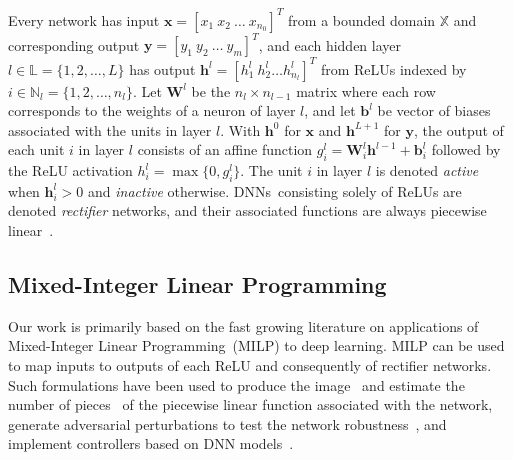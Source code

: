 \documentclass[runningheads]{llncs}
\def\vb{{\bm{b}}}
\def\vh{{\bm{h}}}
\def\vx{{\bm{x}}}
\def\vy{{\bm{y}}}
\def\evg{{g}}
\def\evh{{h}}
\def\evx{{x}}
\def\evy{{y}}
\def\mW{{\bm{W}}}
\def\sL{{\mathbb{L}}}
\def\sN{{\mathbb{N}}}
\def\sX{{\mathbb{X}}}
\newcommand{\dnn}{\textsc{DNN} }
\newcommand{\dnns}{\textsc{DNN}s}
\begin{document}
    Every network has input $\vx = [\evx_1 ~ \evx_2 ~ \dots ~ \evx_{n_0}]^T$ from a bounded domain $\sX$ and corresponding output $\vy = [\evy_1 ~ \evy_2 ~ \dots ~ \evy_m]^T$, and each hidden layer $l \in \sL = \{1,2,\dots,L\}$ has output $\vh^l = [\evh_1^l ~ \evh_2^l \dots \evh_{n_l}^l]^T$ from ReLUs indexed by $i \in \sN_l = \{1, 2, \ldots, n_l\}$. 
    Let $\mW^l$ be the $n_l \times n_{l-1}$ matrix where each row corresponds to the weights of a neuron of layer $l$, and  let $\vb^l$ be vector of biases associated with the units in layer $l$. With $\vh^0$ for $\vx$ and $\vh^{L+1}$ for $\vy$,  the output of each unit $i$ in layer $l$ consists of an affine function $\evg_i^l = \mW_{i}^l \vh^{l-1} + \vb_i^l$ followed by the ReLU activation $\evh_i^l = \max\{0, \evg_i^l\}$. The unit $i$ in layer $l$ is denoted \emph{active} when $\vh_i^l > 0$ and \emph{inactive} otherwise. \dnns~consisting solely of ReLUs are denoted \emph{rectifier} networks, and their associated functions are always piecewise linear~\cite{arora2018understanding}. 

    
\subsection{Mixed-Integer Linear Programming}
        Our work is primarily based on the fast growing literature on applications of Mixed-Integer Linear Programming~(MILP) to deep learning.  MILP can be used to map inputs to outputs of each ReLU and consequently of  rectifier networks. Such formulations have been used to produce the image~\cite{LomuscioMIP,DuttaMIP} and estimate the number of pieces~\cite{serra2018bounding,serra2020empirical} of the piecewise linear function associated with the network, generate adversarial perturbations to test the network robustness~\cite{Cheng2017,FischettiMIP,tjeng2017evaluating,singh2018robustness,xiao2018training,anderson2019strong}, and implement controllers based on \dnn  models~\cite{Planning,XADD}.
        
\end{document}
